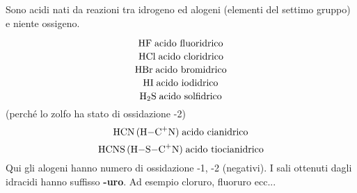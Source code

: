 Sono acidi nati da reazioni tra idrogeno ed alogeni (elementi del settimo gruppo) e niente ossigeno.

$$\ce{HF} \; \text{acido fluoridrico}$$
$$\ce{HCl} \; \text{acido cloridrico}$$
$$\ce{HBr} \; \text{acido bromidrico}$$
$$\ce{HI} \; \text{acido iodidrico}$$
$$\ce{H_2S} \; \text{acido solfidrico}$$
\hspace{+4cm}(perché lo zolfo ha stato di ossidazione -2)
$$\ce{HCN (H-C+N)} \; \text{acido cianidrico}$$
$$\ce{HCNS (H-S-C+N)} \; \text{acido tiocianidrico}$$
Qui gli alogeni hanno numero di ossidazione -1, -2 (negativi). I sali ottenuti dagli idracidi hanno suffisso \textbf{-uro}. Ad esempio cloruro, fluoruro ecc...

